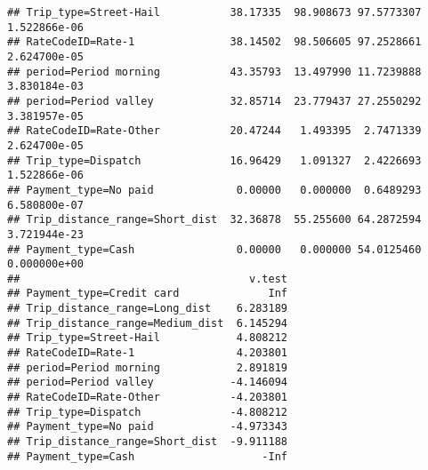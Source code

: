\documentclass[
  18pt,
  a4paper]{article}
\begin{document}
\begin{verbatim}
## Trip_type=Street-Hail           38.17335  98.908673 97.5773307 1.522866e-06
## RateCodeID=Rate-1               38.14502  98.506605 97.2528661 2.624700e-05
## period=Period morning           43.35793  13.497990 11.7239888 3.830184e-03
## period=Period valley            32.85714  23.779437 27.2550292 3.381957e-05
## RateCodeID=Rate-Other           20.47244   1.493395  2.7471339 2.624700e-05
## Trip_type=Dispatch              16.96429   1.091327  2.4226693 1.522866e-06
## Payment_type=No paid             0.00000   0.000000  0.6489293 6.580800e-07
## Trip_distance_range=Short_dist  32.36878  55.255600 64.2872594 3.721944e-23
## Payment_type=Cash                0.00000   0.000000 54.0125460 0.000000e+00
##                                    v.test
## Payment_type=Credit card              Inf
## Trip_distance_range=Long_dist    6.283189
## Trip_distance_range=Medium_dist  6.145294
## Trip_type=Street-Hail            4.808212
## RateCodeID=Rate-1                4.203801
## period=Period morning            2.891819
## period=Period valley            -4.146094
## RateCodeID=Rate-Other           -4.203801
## Trip_type=Dispatch              -4.808212
## Payment_type=No paid            -4.973343
## Trip_distance_range=Short_dist  -9.911188
## Payment_type=Cash                    -Inf
\end{verbatim}
\end{document}
